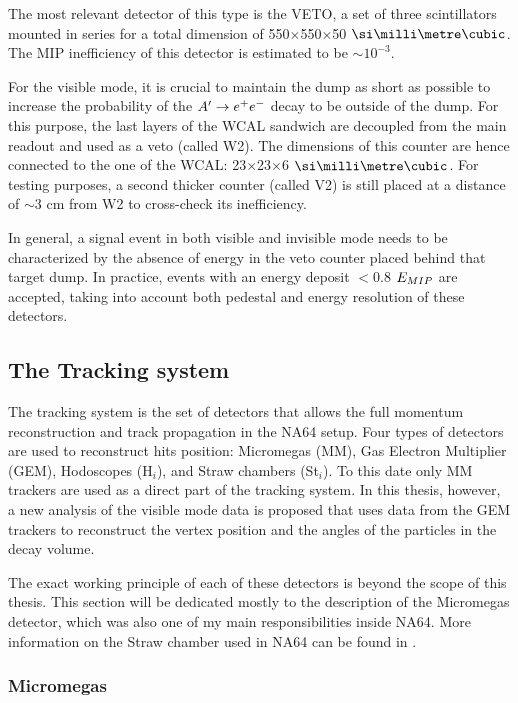 The most relevant detector of this type is the VETO, a set of three scintillators mounted in series for a total dimension of 550$\times$550$\times$50 $\mmc$. The MIP inefficiency of this detector is estimated to be $\sim 10^{-3}$.

For the visible mode, it is crucial to maintain the dump as short as possible to increase the probability of the $A' \to e^+e^-$ decay to be outside of the dump. For this purpose, the last layers of the WCAL sandwich are decoupled from the main readout and used as a veto (called W2). The dimensions of this counter are hence connected to the one of the WCAL: 23$\times$23$\times$6 $\mmc$. For testing purposes, a second thicker counter (called V2) is still placed at a distance of $\sim3$ \si{cm} from W2 to cross-check its inefficiency.

In general, a signal event in both visible and invisible mode needs to be characterized by the absence of energy in the veto counter placed behind that target dump. In practice, events with an energy deposit $<$0.8 $E_{MIP}$ are accepted, taking into account both pedestal and energy resolution of these detectors.

\subsection{The Tracking system}
\label{ch2:sec:detectors-tracking}

The tracking system is the set of detectors that allows the full momentum reconstruction and track propagation in the NA64 setup. Four types of detectors are used to reconstruct hits position: Micromegas (MM), Gas Electron Multiplier (GEM), Hodoscopes (H$_i$), and Straw chambers (St$_i$). To this date only MM trackers are used as a direct part of the tracking system. In this thesis, however, a new analysis of the visible mode data is proposed that uses data from the GEM trackers to reconstruct the vertex position and the angles of the particles in the decay volume.

The exact working principle of each of these detectors is beyond the scope of this thesis. This section will be dedicated mostly to the description of the Micromegas detector, which was also one of my main responsibilities inside NA64. More information on the Straw chamber used in NA64 can be found in \cite{pdegen-thesis}.

\subsubsection{Micromegas}

